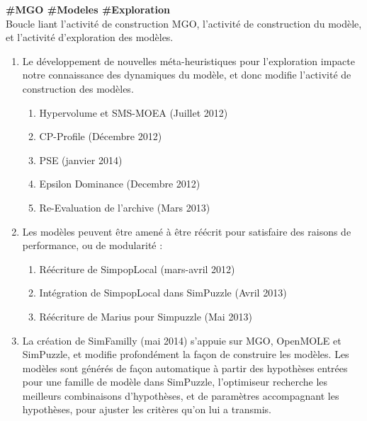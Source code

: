 \begin{myitemize2}
\item [4] \textbf{ \#MGO \#Modeles \#Exploration} \\ Boucle liant l'activité de construction MGO, l'activité de construction du modèle, et l'activité d'exploration des modèles.

\begin{enumerate}
\item  Le développement de nouvelles méta-heuristiques pour l'exploration impacte notre connaissance des dynamiques du modèle, et donc modifie l'activité de construction des modèles.
 \begin{enumerate}
	\item Hypervolume et SMS-MOEA (Juillet 2012)
	\item CP-Profile (Décembre 2012)
	\item PSE (janvier 2014)
	\item Epsilon Dominance (Decembre 2012)
	\item Re-Evaluation de l'archive (Mars 2013)
\end{enumerate}

\item Les modèles peuvent être amené à être réécrit pour satisfaire des raisons de performance, ou de modularité :
\begin{enumerate}
	\item Réécriture de SimpopLocal (mars-avril 2012)
	\item Intégration de SimpopLocal dans SimPuzzle (Avril 2013)
	\item Réécriture de Marius pour Simpuzzle (Mai 2013)
\end{enumerate}

\item La création de SimFamilly (mai 2014) s'appuie sur MGO, OpenMOLE et SimPuzzle, et modifie profondément la façon de construire les modèles. Les modèles sont générés de façon automatique à partir des hypothèses entrées pour une famille de modèle dans SimPuzzle, l'optimiseur recherche les meilleurs combinaisons d'hypothèses, et de paramètres accompagnant les hypothèses, pour ajuster les critères qu'on lui a transmis. 


\end{enumerate}
\end{myitemize2}
